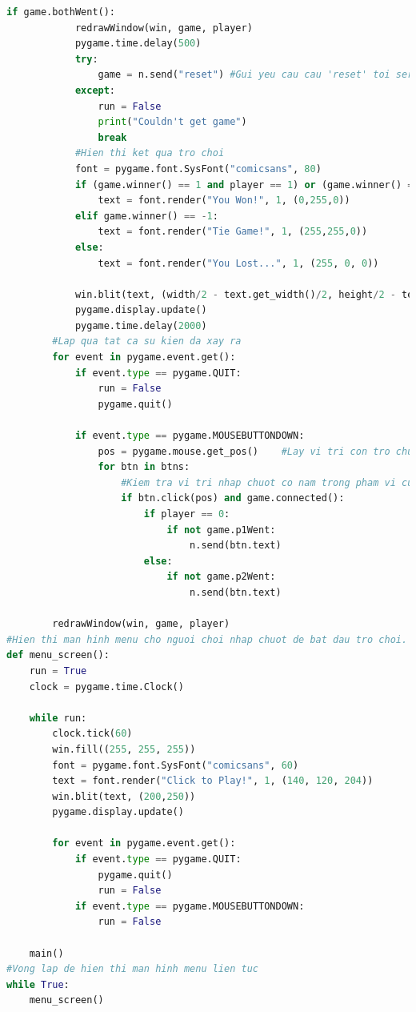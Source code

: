 \documentclass[a4paper]{article}
\begin{document}
\begin{mdframed}[hidealllines=true,backgroundcolor=magenta!10]
\begin{lstlisting}[language=Python]
        if game.bothWent():
            redrawWindow(win, game, player)
            pygame.time.delay(500)
            try:
                game = n.send("reset") #Gui yeu cau cau 'reset' toi server de dat lai trang thai tro choi
            except:
                run = False
                print("Couldn't get game")
                break
            #Hien thi ket qua tro choi
            font = pygame.font.SysFont("comicsans", 80)
            if (game.winner() == 1 and player == 1) or (game.winner() == 0 and player == 0):
                text = font.render("You Won!", 1, (0,255,0))
            elif game.winner() == -1:
                text = font.render("Tie Game!", 1, (255,255,0))
            else:
                text = font.render("You Lost...", 1, (255, 0, 0))

            win.blit(text, (width/2 - text.get_width()/2, height/2 - text.get_height()/2))
            pygame.display.update()
            pygame.time.delay(2000)
        #Lap qua tat ca su kien da xay ra
        for event in pygame.event.get():
            if event.type == pygame.QUIT:
                run = False
                pygame.quit()
            
            if event.type == pygame.MOUSEBUTTONDOWN:
                pos = pygame.mouse.get_pos()    #Lay vi tri con tro chuot
                for btn in btns:
                    #Kiem tra vi tri nhap chuot co nam trong pham vi cua nut hay khong và tro choi da san sang chua
                    if btn.click(pos) and game.connected():
                        if player == 0:
                            if not game.p1Went:
                                n.send(btn.text)
                        else:
                            if not game.p2Went:
                                n.send(btn.text)

        redrawWindow(win, game, player)
#Hien thi man hinh menu cho nguoi choi nhap chuot de bat dau tro choi. Khi nguoi choi nhap chuot, ham 'main' duoc goi de bat dat tro choi
def menu_screen():
    run = True
    clock = pygame.time.Clock()

    while run:
        clock.tick(60)
        win.fill((255, 255, 255))
        font = pygame.font.SysFont("comicsans", 60)
        text = font.render("Click to Play!", 1, (140, 120, 204))
        win.blit(text, (200,250))
        pygame.display.update()

        for event in pygame.event.get():
            if event.type == pygame.QUIT:
                pygame.quit()
                run = False
            if event.type == pygame.MOUSEBUTTONDOWN:
                run = False

    main()
#Vong lap de hien thi man hinh menu lien tuc
while True:
    menu_screen()

	\end{lstlisting}
	\end{mdframed}
\end{document}
